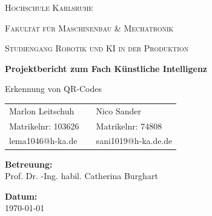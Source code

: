 \documentclass[
    a4paper,        %
    11pt,           %
    ngerman,        %
    parskip=half,   %
    listof=totoc,   %
    bibliography=totoc %
]{scrartcl}
\begin{document}
\begin{titlepage}
    \centering
    \vspace{2cm}
    
    {\scshape\LARGE Hochschule Karlsruhe \par}
    \vspace{1cm}
    {\scshape\Large Fakultät für Maschinenbau \& Mechatronik \par}
    {\scshape\Large Studiengang Robotik und KI in der Produktion \par}
    \vspace{1.5cm}
    
    {\huge\bfseries Projektbericht zum Fach Künstliche Intelligenz \par}
    \vspace{0.5cm}
    {\Large Erkennung von QR-Codes \par}
    
    \vspace{2cm}
    
    \vspace{2cm}
    \begin{center}
        \begin{tabular}{l p{2cm} l}
            Marlon Leitschuh    & & Nico Sander \\
            Matrikelnr: 103626  & & Matrikelnr: 74808 \\
            lema1046@h-ka.de    & & sani1019@h-ka.de.de \\
        \end{tabular}
    \end{center}

    \vfil

    \textbf{Betreuung:} \\
    Prof. Dr. -Ing. habil. Catherina Burghart

    \vspace{0.8cm}
    
    \textbf{Datum:} \\
    \today
    
\end{titlepage}

\tableofcontents            %
\newpage
\listoffigures              %
\newpage
\end{document}
